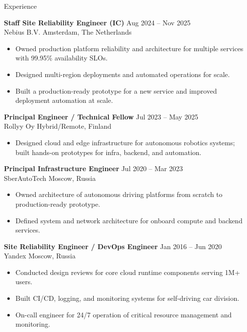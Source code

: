 \documentclass{resume} %
\begin{document}
\begin{rSection}{Experience}

\textbf{Staff Site Reliability Engineer (IC)} \hfill Aug 2024 -- Nov 2025 \\
Nebius B.V. \hfill Amsterdam, The Netherlands
\begin{itemize}
  \item Owned production platform reliability and architecture for multiple services with 99.95\% availability SLOs.
  \item Designed multi-region deployments and automated operations for scale.
  \item Built a production-ready prototype for a new service and improved deployment automation at scale.
\end{itemize}

\textbf{Principal Engineer / Technical Fellow} \hfill Jul 2023 -- May 2025 \\
Rollyy Oy \hfill Hybrid/Remote, Finland
\begin{itemize}
  \item Designed cloud and edge infrastructure for autonomous robotics systems; built hands-on prototypes for infra, backend, and automation.
\end{itemize}

\textbf{Principal Infrastructure Engineer} \hfill Jul 2020 -- Mar 2023 \\
SberAutoTech \hfill Moscow, Russia
\begin{itemize}
  \item Owned architecture of autonomous driving platforms from scratch to production-ready prototype.
  \item Defined system and network architecture for onboard compute and backend services.
\end{itemize}

\textbf{Site Reliability Engineer / DevOps Engineer} \hfill Jan 2016 -- Jun 2020 \\
Yandex \hfill Moscow, Russia
\begin{itemize}
  \item Conducted design reviews for core cloud runtime components serving 1M+ users.
  \item Built CI/CD, logging, and monitoring systems for self-driving car division.
  \item On-call engineer for 24/7 operation of critical resource management and monitoring.
\end{itemize}


\end{rSection}
\end{document}
